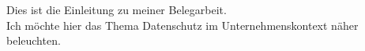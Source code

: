 Dies ist die Einleitung zu meiner Belegarbeit.\\
Ich möchte hier das Thema Datenschutz im Unternehmenskontext näher beleuchten.
